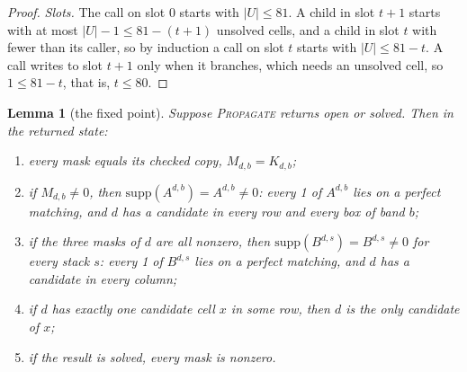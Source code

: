 \documentclass[11pt]{article}
\newtheorem{lemma}[theorem]{Lemma}
\theoremstyle{definition}
\theoremstyle{plain}
\let\origtextsc\textsc
\renewcommand{\textsc}[1]{\textup{\origtextsc{#1}}}
\begin{document}
\begin{proof}
\emph{Slots.} The call on slot 0 starts with $|U|\le 81$. A child in slot $t+1$ starts with at most $|U|-1\le 81-(t+1)$
unsolved cells, and a child in slot $t$ with fewer than its caller, so by induction a call on slot $t$ starts with
$|U|\le 81-t$. A call writes to slot $t+1$ only when it branches, which needs an unsolved cell, so $1\le 81-t$, that
is, $t\le 80$.
\end{proof}

\begin{lemma}[the fixed point]
\label{lem:fixedpoint}
Suppose \textsc{Propagate} returns \emph{open} or \emph{solved}. Then in the returned state:
\begin{enumerate}
\item[(a)] every mask equals its checked copy, $M_{d,b}=K_{d,b}$;
\item[(b)] if $M_{d,b}\neq 0$, then $\mathrm{supp}(A^{d,b})=A^{d,b}\neq 0$: every 1 of $A^{d,b}$ lies on a perfect
  matching, and $d$ has a candidate in every row and every box of band $b$;
\item[(c)] if the three masks of $d$ are all nonzero, then $\mathrm{supp}(B^{d,s})=B^{d,s}\neq 0$ for every stack $s$:
  every 1 of $B^{d,s}$ lies on a perfect matching, and $d$ has a candidate in every column;
\item[(d)] if $d$ has exactly one candidate cell $x$ in some row, then $d$ is the only candidate of $x$;
\item[(e)] if the result is \emph{solved}, every mask is nonzero.
\end{enumerate}
\end{lemma}
\end{document}
